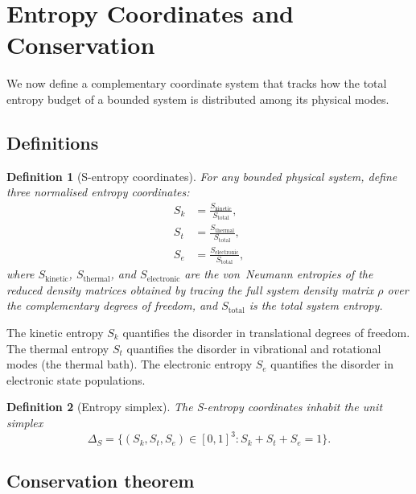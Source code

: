 \documentclass[11pt,twocolumn,a4paper]{article}
\newtheorem{definition}{Definition}
\newcommand{\Sk}{S_k}
\newcommand{\St}{S_t}
\newcommand{\Se}{S_e}
\newcommand{\Stot}{S_{\mathrm{total}}}
\begin{document}
\section{Entropy Coordinates and Conservation}\label{sec:entropy}

We now define a complementary coordinate system that tracks how the total entropy budget of a bounded system is distributed among its physical modes.

\subsection{Definitions}

\begin{definition}[S-entropy coordinates]\label{def:sentropy}
For any bounded physical system, define three normalised entropy coordinates:
\begin{align}
\Sk &= \frac{S_{\mathrm{kinetic}}}{\Stot}, \label{eq:Sk} \\
\St &= \frac{S_{\mathrm{thermal}}}{\Stot}, \label{eq:St} \\
\Se &= \frac{S_{\mathrm{electronic}}}{\Stot}, \label{eq:Se}
\end{align}
where $S_{\mathrm{kinetic}}$, $S_{\mathrm{thermal}}$, and $S_{\mathrm{electronic}}$ are the von~Neumann entropies \citep{vonNeumann1932} of the reduced density matrices obtained by tracing the full system density matrix $\rho$ over the complementary degrees of freedom, and $\Stot$ is the total system entropy.
\end{definition}

The kinetic entropy $\Sk$ quantifies the disorder in translational degrees of freedom.
The thermal entropy $\St$ quantifies the disorder in vibrational and rotational modes (the thermal bath).
The electronic entropy $\Se$ quantifies the disorder in electronic state populations.

\begin{definition}[Entropy simplex]\label{def:simplex}
The S-entropy coordinates inhabit the unit simplex
\begin{equation}\label{eq:simplex}
\Delta_S = \{(\Sk, \St, \Se) \in [0,1]^3 : \Sk + \St + \Se = 1\}.
\end{equation}
\end{definition}

\subsection{Conservation theorem}
\end{document}
